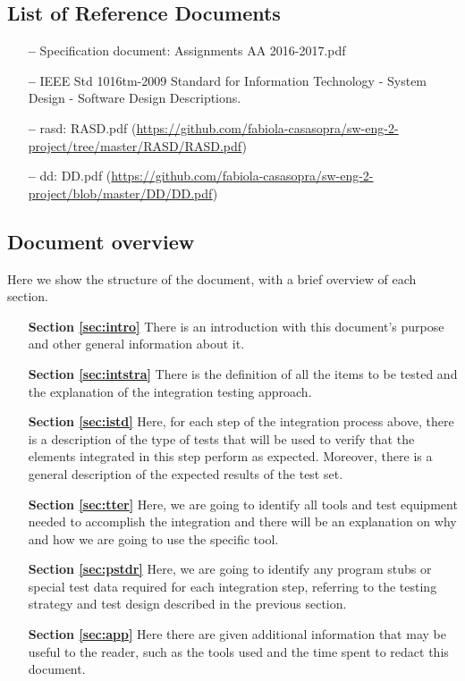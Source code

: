 \subsection{List of Reference Documents}

\begin{itemize}
\item[\textbf{--}] Specification document: Assignments AA 2016-2017.pdf
\item[\textbf{--}] IEEE Std 1016tm-2009 Standard for Information Technology - System Design - Software Design Descriptions.
\item[\textbf{--}] \acl{rasd}: RASD.pdf 
\newline
(\url{https://github.com/fabiola-casasopra/sw-eng-2-project/tree/master/RASD/RASD.pdf})
\item[\textbf{--}] \acl{dd}: DD.pdf 
\newline
(\url{https://github.com/fabiola-casasopra/sw-eng-2-project/blob/master/DD/DD.pdf})
\end{itemize}

\subsection{Document overview}

Here we show the structure of the document, with a brief overview of each section.

\begin{itemize}

\item[\textbf{Section \ref{sec:intro}}]There is an introduction with this document's purpose and other general information about it.

\item[\textbf{Section \ref{sec:intstra}}]There is the definition of all the items to be tested and the explanation of the integration testing approach.

\item[\textbf{Section \ref{sec:istd}}]Here, for each step of the integration process above, there is a description of the type of tests that will be used to verify that the elements integrated in this step perform as expected. Moreover, there is a general description of the expected results of the test set.  

\item[\textbf{Section \ref{sec:tter}}]Here, we are going to identify all tools and test equipment needed to accomplish the integration and there will be an explanation on why and how we are going to use the specific tool. 

\item[\textbf{Section \ref{sec:pstdr}}]Here, we are going to identify any program stubs or special test data required for each integration step, referring to the testing strategy and test design described in the previous section.

\item[\textbf{Section \ref{sec:app}}]Here there are given additional information that may be useful to the reader, such as the tools used and the time spent to redact this document.
\end{itemize}